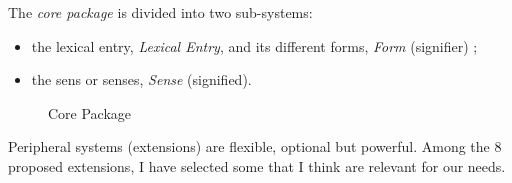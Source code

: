 \documentclass[a4paper,12pt]{article}
\begin{document}
\pagebreak %
The \textit{core package} is divided into two sub-systems:
\begin{itemize}
\item the lexical entry, \textit{Lexical Entry}, and its different forms, \textit{Form} (signifier) ;
\item the sens or senses, \textit{Sense} (signified).
\end{itemize}

\begin{figure}[h]
\centerline{}
\caption{Core Package}
\end{figure}

\pagebreak %

Peripheral systems (extensions) are flexible, optional but powerful. Among the 8 proposed extensions, I have selected some that I think are relevant for our needs.
\end{document}
